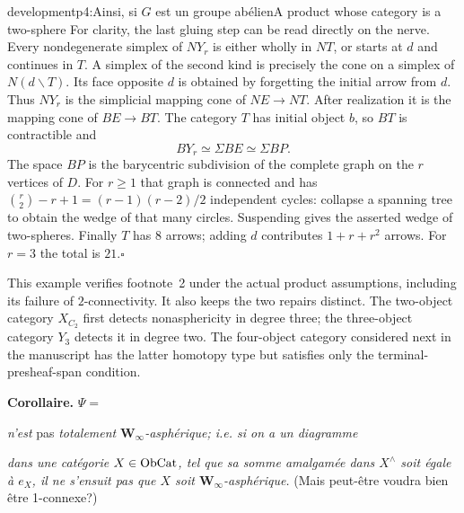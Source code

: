 \begin{dcomment}{development}{p4:Ainsi, si $G$ est un groupe abélien}{A product whose category is a two-sphere}
For clarity, the last gluing step can be read directly on the nerve. Every nondegenerate simplex of $NY_r$ is either wholly in $NT$, or starts at $d$ and continues in $T$. A simplex of the second kind is precisely the cone on a simplex of $N(d\backslash T)$. Its face opposite $d$ is obtained by forgetting the initial arrow from $d$. Thus $NY_r$ is the simplicial mapping cone of $NE\to NT$. After realization it is the mapping cone of $BE\to BT$. The category $T$ has initial object $b$, so $BT$ is contractible and
\[
 BY_r\simeq\Sigma BE\simeq\Sigma BP.
\]
The space $BP$ is the barycentric subdivision of the complete graph on the $r$ vertices of $D$. For $r\ge1$ that graph is connected and has $\binom r2-r+1=(r-1)(r-2)/2$ independent cycles: collapse a spanning tree to obtain the wedge of that many circles. Suspending gives the asserted wedge of two-spheres. Finally $T$ has $8$ arrows; adding $d$ contributes $1+r+r^2$ arrows. For $r=3$ the total is $21$.\hfill$\square$

This example verifies footnote~2 under the actual product assumptions, including its failure of $2$-connectivity. It also keeps the two repairs distinct. The two-object category $X_{C_2}$ first detects nonasphericity in degree three; the three-object category $Y_3$ detects it in degree two. The four-object category considered next in the manuscript has the latter homotopy type but satisfies only the terminal-presheaf-span condition.
\end{dcomment}


\textbf{Corollaire.} $\Psi = {}$
\textit{n'est} pas \textit{totalement} $\mathbf{W}_\infty$\textit{-asphérique; i.e. si on a un diagramme} 
\textit{dans une catégorie} $X\in\mathrm{Ob}\mathrm{Cat}$\textit{, tel que sa somme amalgamée dans $X^\wedge$ soit égale à $e_X$, il ne s'ensuit pas que $X$ soit $\mathbf{W}_\infty$-asphérique.} (Mais peut-être voudra bien être 1-connexe?)

